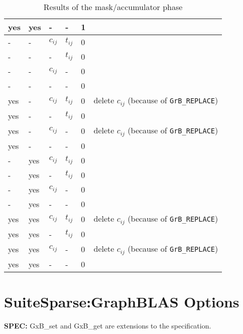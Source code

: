 \documentclass[12pt]{article}
\begin{document}
\begin{table}
{\begin{tabular}{lllll|l}
    yes&yes &  -       &  -        & 1    &   \\
\hline
\hline
    -  &-   & $c_{ij}$ & $t_{ij}$  & 0    &   \\
    -  &-   &  -       & $t_{ij}$  & 0    &   \\
    -  &-   & $c_{ij}$ &  -        & 0    &   \\
    -  &-   &  -       &  -        & 0    &   \\
\hline
    yes&-   & $c_{ij}$ & $t_{ij}$  & 0    &  delete $c_{ij}$  (because of \verb'GrB_REPLACE') \\
    yes&-   &  -       & $t_{ij}$  & 0    &   \\
    yes&-   & $c_{ij}$ &  -        & 0    &  delete $c_{ij}$  (because of \verb'GrB_REPLACE') \\
    yes&-   &  -       &  -        & 0    &   \\
\hline
    -  &yes & $c_{ij}$ & $t_{ij}$  & 0    &   \\
    -  &yes &  -       & $t_{ij}$  & 0    &   \\
    -  &yes & $c_{ij}$ &  -        & 0    &   \\
    -  &yes &  -       &  -        & 0    &   \\
\hline
    yes&yes & $c_{ij}$ & $t_{ij}$  & 0    &  delete $c_{ij}$  (because of \verb'GrB_REPLACE') \\
    yes&yes &  -       & $t_{ij}$  & 0    &   \\
    yes&yes & $c_{ij}$ &  -        & 0    &  delete $c_{ij}$  (because of \verb'GrB_REPLACE') \\
    yes&yes &  -       &  -        & 0    &   \\
\hline
\end{tabular}
}
\caption{Results of the mask/accumulator phase \label{tab:maskaccum}}
\end{table}


\newpage
\section{SuiteSparse:GraphBLAS Options} %
\label{options}

\begin{spec}
{\bf SPEC:} {\sf GxB\_set} and {\sf GxB\_get} are extensions to the
specification.
\end{spec}
\end{document}
